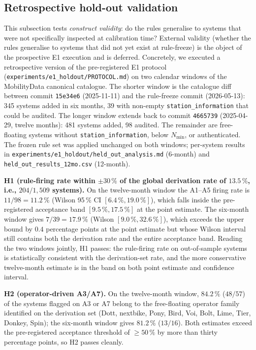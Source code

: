\documentclass[11pt,a4paper]{article}
\begin{document}
\subsection{Retrospective hold-out validation}
\label{secHoldoutValidation}
This subsection tests \emph{construct validity}: do the rules
generalise to systems that were not specifically inspected at
calibration time? External validity (whether the rules generalise
to systems that did not yet exist at rule-freeze) is the object
of the prospective E1 execution and is deferred. Concretely, we
executed a retrospective version of the pre-registered E1
protocol (\texttt{experiments/e1\_holdout/PROTOCOL.md}) on two
calendar windows of the MobilityData canonical catalogue. The
shorter window is the catalogue diff between commit
\texttt{15e34e6} (2025-11-11) and the rule-freeze commit
(2026-05-13): 345 systems added in six months, 39 with non-empty
\texttt{station\_information} that could be audited. The longer
window extends back to commit \texttt{4665739} (2025-04-29,
twelve months): 481 systems added, 98 audited. The remainder
are free-floating systems without \texttt{station\_information},
below $N_{\min}$, or authenticated. The frozen rule set was
applied unchanged on both windows; per-system results in
\texttt{experiments/e1\_holdout/held\_out\_analysis.md} (6-month)
and \texttt{held\_out\_results\_12mo.csv} (12-month).

\textbf{H1 (rule-firing rate within $\pm 30\,\%$ of the
global derivation rate of $13.5\,\%$, i.e., $204/1{,}509$
systems).} On the twelve-month window the
A1--A5 firing rate is $11/98 = 11.2\,\%$ (Wilson 95\,\% CI
$[6.4\,\%, 19.0\,\%]$), which falls inside the pre-registered
acceptance band $[9.5\,\%, 17.5\,\%]$ at the point estimate.
The six-month window gives $7/39 = 17.9\,\%$ (Wilson
$[9.0\,\%, 32.6\,\%]$), which exceeds the upper bound by
$0.4$ percentage points at the point estimate but whose Wilson
interval still contains both the derivation rate and the entire
acceptance band. Reading the two windows jointly,
H1 passes: the rule-firing rate on out-of-sample
systems is statistically consistent with the derivation-set
rate, and the more conservative twelve-month estimate is in
the band on both point estimate and confidence interval.

\textbf{H2 (operator-driven A3/A7).} On the twelve-month window,
$84.2\,\%$ ($48/57$) of the systems flagged on A3 or A7 belong
to the free-floating operator family identified on the
derivation set (Dott, nextbike, Pony, Bird, Voi, Bolt, Lime,
Tier, Donkey, Spin); the six-month window gives $81.2\,\%$
($13/16$). Both estimates exceed the pre-registered acceptance
threshold of $\geq 50\,\%$ by more than thirty percentage
points, so H2 passes cleanly.
\end{document}
